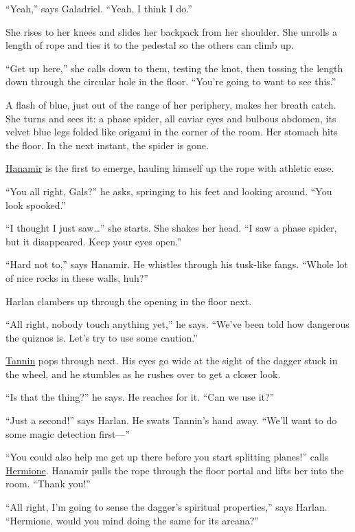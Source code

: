 \documentclass[smalldemyvopaper,11pt,twoside,onecolumn,openright,extrafontsizes]{memoir}
\begin{document}
``Yeah,'' says Galadriel. ``Yeah, I think I do.''

She rises to her knees and slides her backpack from her shoulder. She
unrolls a length of rope and ties it to the pedestal so the others can
climb up.

``Get up here,'' she calls down to them, testing the knot, then tossing
the length down through the circular hole in the floor. ``You're going
to want to see this.''

A flash of blue, just out of the range of her periphery, makes her
breath catch. She turns and sees it: a phase spider, all caviar eyes and
bulbous abdomen, its velvet blue legs folded like origami in the corner
of the room. Her stomach hits the floor. In the next instant, the spider
is gone.

\href{/characters/hanamir/}{Hanamir} is the first to emerge, hauling
himself up the rope with athletic ease.

``You all right, Gals?'' he asks, springing to his feet and looking
around. ``You look spooked.''

``I thought I just saw\ldots{}'' she starts. She shakes her head. ``I
saw a phase spider, but it disappeared. Keep your eyes open.''

``Hard not to,'' says Hanamir. He whistles through his tusk-like fangs.
``Whole lot of nice rocks in these walls, huh?''

Harlan clambers up through the opening in the floor next.

``All right, nobody touch anything yet,'' he says. ``We've been told how
dangerous the quiznos is. Let's try to use some caution.''

\href{/characters/tannin/}{Tannin} pops through next. His eyes go wide
at the sight of the dagger stuck in the wheel, and he stumbles as he
rushes over to get a closer look.

``Is that the thing?'' he says. He reaches for it. ``Can we use it?''

``Just a second!'' says Harlan. He swats Tannin's hand away. ``We'll
want to do some magic detection first---''

``You could also help me get up there before you start splitting
planes!'' calls \href{/characters/hermione/}{Hermione}. Hanamir pulls
the rope through the floor portal and lifts her into the room. ``Thank
you!''

``All right, I'm going to sense the dagger's spiritual properties,''
says Harlan. ``Hermione, would you mind doing the same for its arcana?''
\end{document}
